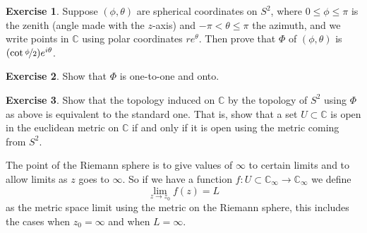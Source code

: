 \documentclass[12pt,openany]{book}
\newcommand{\C}{{\mathbb{C}}}
\theoremstyle{plain}
\theoremstyle{remark}
\theoremstyle{definition}
\newenvironment{exbox}{%
    \def\FrameCommand{\vrule width 1pt \relax\hspace {10pt}}%
    \MakeFramed {\advance \hsize -\width \FrameRestore }%
}{%
    \endMakeFramed
}
\theoremstyle{exercise}
\newtheorem{exercise}{Exercise}[section]
\theoremstyle{example}
\begin{document}
\begin{exbox}
\begin{exercise}
Suppose $(\phi,\theta)$
are spherical coordinates on $S^2$, where $0 \leq \phi \leq \pi$ is the zenith (angle made
with the $z$-axis) and $-\pi < \theta \leq \pi$ the azimuth, and we write
points in $\C$ using polar coordinates $re^{\theta}$.  Then prove that $\Phi$ of
$(\phi,\theta)$ is $(\cot \nicefrac{\phi}{2})e^{i\theta}$.
\end{exercise}

\begin{exercise}
Show that $\Phi$ is one-to-one and onto.
\end{exercise}

\begin{exercise}
Show that the topology induced on $\C$ by the topology of $S^2$ using $\Phi$
as above is equivalent to the standard one.  That is, show that a set $U
\subset \C$
is open in the euclidean metric on $\C$ if and only if it is open using the
metric coming from $S^2$.
\end{exercise}
\end{exbox}

The point of the Riemann sphere is to give values of $\infty$ to certain
limits and to allow limits as $z$ goes to $\infty$.  So if we have a
function $f \colon U \subset \C_\infty \to \C_\infty$ we define
\begin{equation*}
\lim_{z \to z_0} f(z) = L
\end{equation*}
as the metric space limit using the metric on the Riemann sphere, this
includes the cases when $z_0 = \infty$ and when $L = \infty$.
\end{document}
